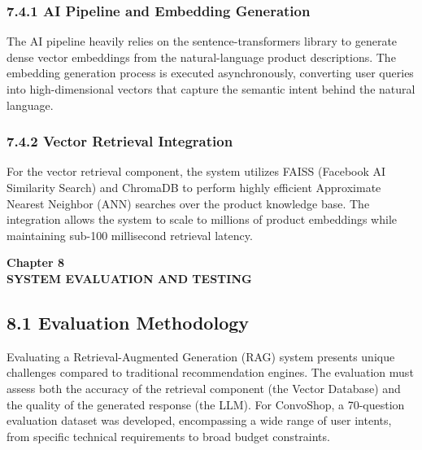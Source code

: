 \subsubsection*{7.4.1 AI Pipeline and Embedding Generation}
The AI pipeline heavily relies on the sentence-transformers library to generate dense vector embeddings from the natural-language product descriptions. The embedding generation process is executed asynchronously, converting user queries into high-dimensional vectors that capture the semantic intent behind the natural language. 

\subsubsection*{7.4.2 Vector Retrieval Integration}
For the vector retrieval component, the system utilizes FAISS (Facebook AI Similarity Search) and ChromaDB to perform highly efficient Approximate Nearest Neighbor (ANN) searches over the product knowledge base. The integration allows the system to scale to millions of product embeddings while maintaining sub-100 millisecond retrieval latency.

\newpage
\begin{center}
{\fontsize{14}{17}\bfseries Chapter 8\\[6pt]}
{\fontsize{16}{20}\bfseries SYSTEM EVALUATION AND TESTING\\[10pt]}
\end{center}

\subsection*{8.1 Evaluation Methodology}
Evaluating a Retrieval-Augmented Generation (RAG) system presents unique challenges compared to traditional recommendation engines. The evaluation must assess both the accuracy of the retrieval component (the Vector Database) and the quality of the generated response (the LLM). For ConvoShop, a 70-question evaluation dataset was developed, encompassing a wide range of user intents, from specific technical requirements to broad budget constraints.

